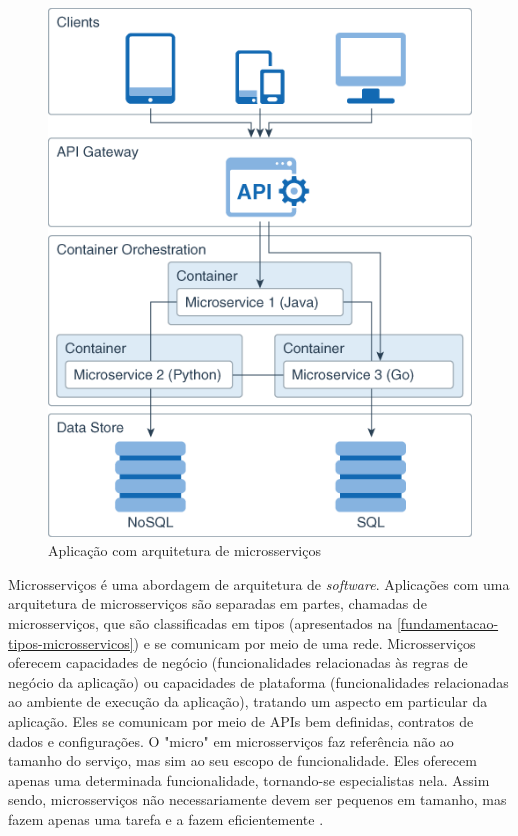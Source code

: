 \begin{figure}[htb]
	\caption{\label{figura_arquitetura_microsservicos}Aplicação com arquitetura de microsserviços}
	\begin{center}
	    \includegraphics[scale=0.5]{Imagens/microservice_architecture.png}
	\end{center}
\end{figure}

Microsserviços é uma abordagem de arquitetura de \emph{software}. Aplicações com uma arquitetura de microsserviços são separadas em partes, chamadas de microsserviços, que são classificadas em tipos (apresentados na \autoref{fundamentacao-tipos-microsservicos}) e se comunicam por meio de uma rede. Microsserviços oferecem capacidades de negócio (funcionalidades relacionadas às regras de negócio da aplicação) ou capacidades de plataforma (funcionalidades relacionadas ao ambiente de execução da aplicação), tratando um aspecto em particular da aplicação. Eles se comunicam por meio de APIs bem definidas, contratos de dados e configurações. O "micro" em microsserviços faz referência não ao tamanho do serviço, mas sim ao seu escopo de funcionalidade. Eles oferecem apenas uma determinada funcionalidade, tornando-se especialistas nela. Assim sendo, microsserviços não necessariamente devem ser pequenos em tamanho, mas fazem apenas uma tarefa e a fazem eficientemente \cite{Familiar2015}.
 
